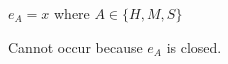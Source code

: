 \begin{case}
$e_{A}=x$ where $A\in\lbrace H,M,S\rbrace$

Cannot occur because $e_{A}$ is closed.
\end{case}